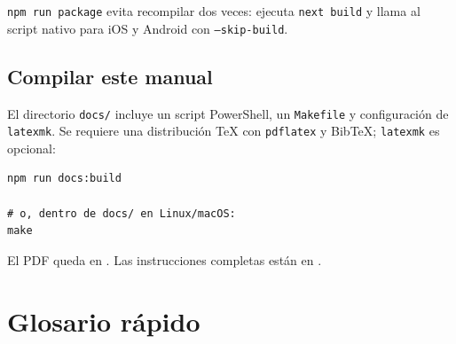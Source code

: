 \documentclass[11pt,a4paper,oneside]{article}
\newcommand{\code}[1]{\texttt{#1}}
\begin{document}
\code{npm run package} evita recompilar dos veces: ejecuta \code{next build} y llama al script nativo para iOS y Android con \code{--skip-build}.

\subsection{Compilar este manual}

El directorio \code{docs/} incluye un script PowerShell, un \code{Makefile} y configuraci\'on de \code{latexmk}. Se requiere una distribuci\'on TeX con \code{pdflatex} y BibTeX; \code{latexmk} es opcional:

\begin{lstlisting}
npm run docs:build

# o, dentro de docs/ en Linux/macOS:
make
\end{lstlisting}

El PDF queda en . Las instrucciones completas est\'an en .

\section{Glosario r\'apido}
\end{document}
